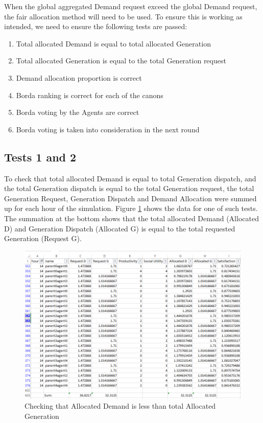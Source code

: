 When the global aggregated Demand request exceed the global Demand request, the fair allocation method will need to be used. To ensure this is working as intended, we need to ensure the following tests are passed:

\begin{enumerate}
	\item Total allocated Demand is equal to total allocated Generation
	\item Total allocated Generation is equal to the total Generation request
	\item Demand allocation proportion is correct
	\item Borda ranking is correct for each of the canons
	\item Borda voting by the Agents are correct
	\item Borda voting is taken into consideration in the next round
\end{enumerate}

\subsection*{Tests 1 and 2}
To check that total allocated Demand is equal to total Generation dispatch, and the total Generation dispatch is equal to the total Generation request, the total Generation Request, Generation Dispatch and Demand Allocation were summed up for each hour of the simulation.  Figure \ref{fig:test3} shows the data for one of such tests. The summation at the bottom shows that the total allocated Demand (Allocated D) and Generation Dispatch (Allocated G) is equal to the total requested Generation (Request G).

\begin{figure}[h!]
	\centering
	\includegraphics[scale=0.4]{Images/test-allocation2.png}
	\caption{Checking that Allocated Demand is less than total Allocated Generation}
	\label{fig:test3}
\end{figure}

